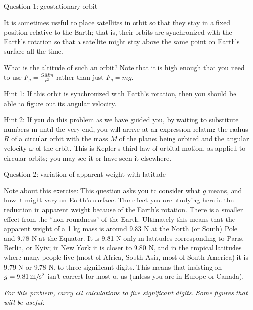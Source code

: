 \documentclass[12pt]{article}
\begin{document}
\Large
\centerline{}
\normalsize
\centerline{}

\medskip


\centerline{\Large Question 1: geostationary orbit}

It is sometimes useful to place satellites in orbit so that they stay in a fixed position relative to the
Earth; that is, their orbits are synchronized with the Earth's rotation so that a satellite might stay
above the same point on Earth’s surface all the time.

What is the altitude of such an orbit? Note that it is high enough that you need to use $F_g=\frac{GMm}{r^2}$
rather than just $F_g = mg$.

{\sc Hint 1:} If this orbit is synchronized with Earth's rotation, then you should be able to figure out its
angular velocity.

{\sc Hint 2:} If you do this problem as we have guided you, by waiting to substitute numbers in until the 
very end, you will arrive at an expression relating the radius $R$ of a circular orbit with the mass $M$ of the 
planet being orbited and the angular velocity $\omega$ of the orbit. This is Kepler's third law of orbital motion,
as applied to circular orbits; you may see it or have seen it elsewhere.

\newpage

\centerline{\Large Question 2: variation of apparent weight with latitude}

\medskip

{\footnotesize Note about this exercise: This question asks you to consider what $g$ means, and how it might vary on Earth's surface. The effect you are studying here is the reduction in apparent weight because of the Earth's rotation. There is a smaller effect from the ``non-roundness'' of the Earth. Ultimately this means that the apparent weight of a 1 kg mass is around 9.83 N at the North (or South) Pole and 9.78 N at the Equator. It is 9.81 N only in latitudes corresponding to Paris, Berlin, or Kyiv; in New York it is closer to 9.80 N, and in the tropical latitudes where many people live (most of Africa, South Asia, most of South America) it is 9.79 N or 9.78 N, to three significant digits. This means that insisting on $g=9.81\,\rm m/\rm s^2$ isn't correct for most of us (unless you are in Europe or Canada).
}


\it For this problem, carry all calculations to five significant digits. Some figures that will be useful:
\end{document}
